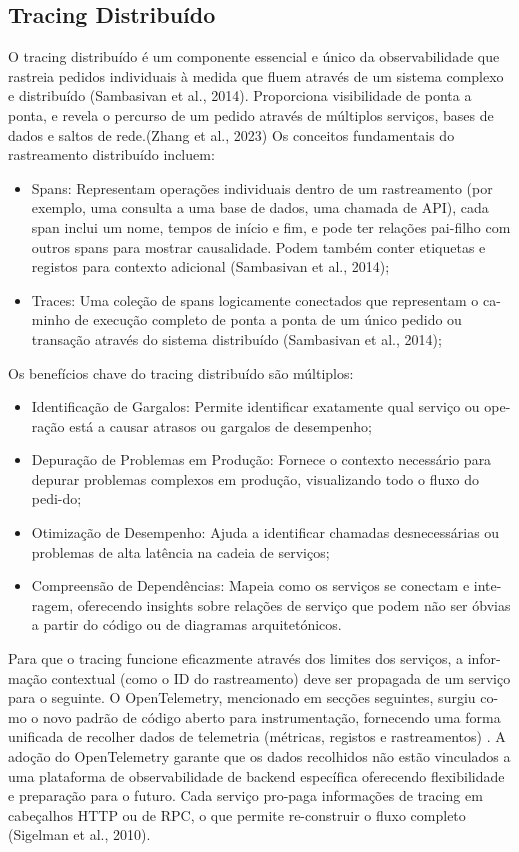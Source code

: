 \subsection{Tracing Distribuído}

O tracing distribuído é um componente essencial e único da observabilidade que rastreia pedidos individuais à medida que fluem através de um sistema complexo e distribuído (Sambasivan et al., 2014). Proporciona visibilidade de ponta a ponta, e revela o percurso de um pedido através de múltiplos serviços, bases de dados e saltos de rede.(Zhang et al., 2023)
Os conceitos fundamentais do rastreamento distribuído incluem:

\begin{itemize}
    \item Spans: Representam operações individuais dentro de um rastreamento (por exemplo, uma consulta a uma base de dados, uma chamada de API), cada span inclui um nome, tempos de início e fim, e pode ter relações pai-filho com outros spans para mostrar causalidade. Podem também conter etiquetas e registos para contexto adicional (Sambasivan et al., 2014);
    \item Traces: Uma coleção de spans logicamente conectados que representam o ca-minho de execução completo de ponta a ponta de um único pedido ou transação através do sistema distribuído (Sambasivan et al., 2014);
\end{itemize}

Os benefícios chave do tracing distribuído são múltiplos:

\begin{itemize}
    \item Identificação de Gargalos: Permite identificar exatamente qual serviço ou ope-ração está a causar atrasos ou gargalos de desempenho;
    \item Depuração de Problemas em Produção: Fornece o contexto necessário para depurar problemas complexos em produção, visualizando todo o fluxo do pedi-do;
    \item Otimização de Desempenho: Ajuda a identificar chamadas desnecessárias ou problemas de alta latência na cadeia de serviços;
    \item Compreensão de Dependências: Mapeia como os serviços se conectam e inte-ragem, oferecendo insights sobre relações de serviço que podem não ser óbvias a partir do código ou de diagramas arquitetónicos.
\end{itemize}

Para que o tracing funcione eficazmente através dos limites dos serviços, a infor-mação contextual (como o ID do rastreamento) deve ser propagada de um serviço para o seguinte. O OpenTelemetry, mencionado em secções seguintes, surgiu co-mo o novo padrão de código aberto para instrumentação, fornecendo uma forma unificada de recolher dados de telemetria (métricas, registos e rastreamentos) \cite{Thakur2022}. A adoção do OpenTelemetry garante que os dados recolhidos não estão vinculados a uma plataforma de observabilidade de backend específica oferecendo flexibilidade e preparação para o futuro. Cada serviço pro-paga informações de tracing em cabeçalhos HTTP ou de RPC, o que permite re-construir o fluxo completo (Sigelman et al., 2010).


